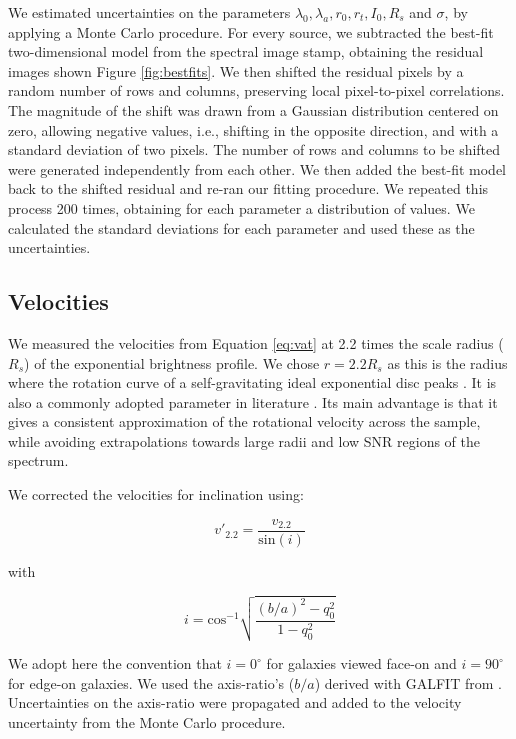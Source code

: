 \documentclass{emulateapj}
\begin{document}
We estimated uncertainties on the parameters $\lambda_0,\lambda_a,r_0,r_t,I_0,R_s$ and $\sigma$, by applying a Monte Carlo procedure. For every source, we subtracted the best-fit two-dimensional model from the spectral image stamp, obtaining the residual images shown Figure \ref{fig:bestfits}. We then shifted the residual pixels by a random number of rows and columns, preserving local pixel-to-pixel correlations. The magnitude of the shift was drawn from a Gaussian distribution centered on zero, allowing negative values, i.e., shifting in the opposite direction, and with a standard deviation of two pixels. The number of rows and columns to be shifted were generated independently from each other. We then added the best-fit model back to the shifted residual and re-ran our fitting procedure. We repeated this process 200 times, obtaining for each parameter a distribution of values. We calculated the standard deviations for each parameter and used these as the uncertainties. 

\subsection{Velocities}
\label{sec:vel}

We measured the velocities from Equation \ref{eq:vat} at 2.2 times the scale radius ($R_s$) of the exponential brightness profile. We chose $r=2.2R_s$ as this is the radius where the rotation curve of a self-gravitating ideal exponential disc peaks \citep{Freeman70}. It is also a commonly adopted parameter in literature \citep[e.g.][]{Miller11}. Its main advantage is that it gives a consistent approximation of the rotational velocity across the sample, while avoiding extrapolations towards large radii and low SNR regions of the spectrum.

We corrected the velocities for inclination {using}: 

\begin{equation}
v'_{2.2}=\frac{v_{2.2}}{\mathrm{sin}(i)}
\end{equation}

with

\begin{equation}
i=\mathrm{cos^{-1}}\sqrt{\frac{(b/a)^2-q_0^2}{1-q_0^2}}
\end{equation}

We adopt here the convention that $i=0^{\circ}$ for galaxies viewed face-on and $i=90^{\circ}$ for edge-on galaxies. We used the axis-ratio's {($b/a$)} derived with GALFIT from \citet{vanderWel14a}. {Uncertainties on the axis-ratio were propagated and added to the velocity uncertainty from the Monte Carlo procedure.} 
\end{document}

